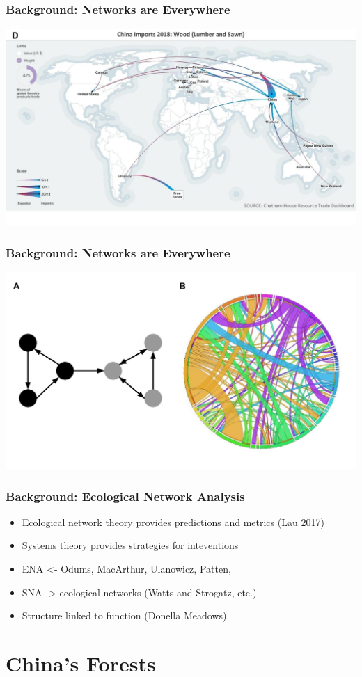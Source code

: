 \documentclass[aspectratio=169]{beamer}
\begin{document}
\begin{frame}
  \frametitle{Background: Networks are Everywhere}

\begin{center}\includegraphics[width=0.5\linewidth]{images/resourcetrade_network} \end{center}


\end{frame}


\begin{frame}
  \frametitle{Background: Networks are Everywhere}

\begin{center}\includegraphics[width=0.5\linewidth]{images/example_network} \end{center}

\end{frame}

\begin{frame}
  \frametitle{Background: Ecological Network Analysis}

  \begin{itemize}
\item Ecological network theory provides predictions and metrics (Lau 2017)
\item Systems theory provides strategies for inteventions
\item ENA <- Odums, MacArthur, Ulanowicz, Patten,
\item SNA -> ecological networks (Watts and Strogatz, etc.)
\item Structure linked to function (Donella Meadows)
  \end{itemize}


\section{China's Forests}

\end{frame}
\end{document}
